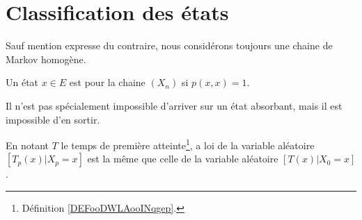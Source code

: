 \section{Classification des états}

Sauf mention expresse du contraire, nous considérons toujours une chaine de Markov homogène.

\begin{definition}      \label{DEFooFIQUooScQDMI}
	Un état \( x\in E\) est  pour la chaine \( (X_n)\) si \( p(x,x)=1\).
\end{definition}
Il n'est pas spécialement impossible d'arriver sur un état absorbant, mais il est impossible d'en sortir.

\begin{proposition}
	En notant \( T\) le temps de première atteinte\footnote{Définition \ref{DEFooDWLAooINqgep}.}, a loi de la variable aléatoire \( [T_p(x)|X_p=x]\) est la même que celle de la variable aléatoire \( [T(x)|X_0=x]\).
\end{proposition}

